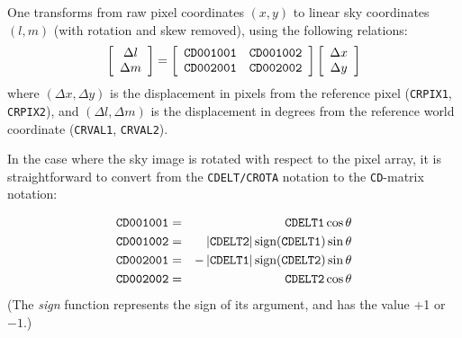 One transforms from raw pixel coordinates $(x,y)$ to linear sky coordinates 
$(l,m)$ (with rotation and skew removed), using the following relations:
\begin{displaymath}
\left[ \begin{array}{c} \Delta l \\ \Delta m \end{array} \right] = 
\left[ \begin{array}{cc} {\tt CD001001} & {\tt CD001002} \\ {\tt CD002001}
& {\tt CD002002} \end{array} \right] \left[ \begin{array}{c} \Delta x \\
\Delta y \end{array} \right]
\end{displaymath}
where $(\Delta x, \Delta y)$ is the displacement in pixels from the reference
pixel ({\tt CRPIX1}, {\tt CRPIX2}), and $(\Delta l, \Delta m)$ is the 
displacement in degrees from the reference world coordinate ({\tt CRVAL1},
{\tt CRVAL2}).

In the case where the sky image is rotated with respect to the pixel
array, it is straightforward to convert from the {\tt CDELT/CROTA} notation
to the {\tt CD}-matrix notation:

\begin{eqnarray*}
{\tt CD001001} & = & {\tt CDELT1} \cos \theta \\
{\tt CD001002} & = & \left| {\tt CDELT2} \right| \hbox{sign}({\tt CDELT1}) 
 \sin \theta \\
{\tt CD002001} & = & - \left| {\tt CDELT1} \right| \hbox{sign}({\tt CDELT2}) 
 \sin \theta \\
{\tt CD002002} & = & {\tt CDELT2} \cos \theta \\
\end{eqnarray*}
(The {\it sign} function represents the sign of its argument, and has the
value +1 or $-1$.)

